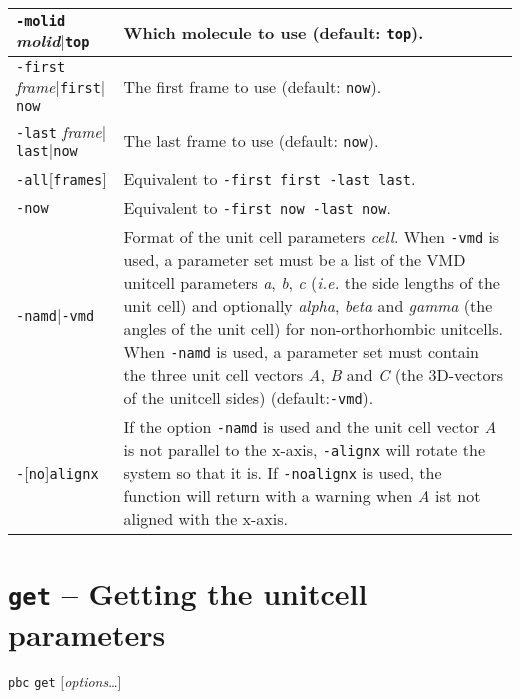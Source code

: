 \documentclass[a4paper, DIV12]{scrartcl}
\newcommand{\ie}{\emph{i.e.}\xspace}
\begin{document}
\begin{tabular}{|p{}|p{}|}
\hline

\texttt{-molid} \textit{molid}$|$\texttt{top}
& Which molecule to use (default: \texttt{top}).
\\ \hline

\texttt{-first} \textit{frame}$|$\texttt{first}$|$\texttt{now}
& The first frame to use (default: \texttt{now}).
\\ \hline

\texttt{-last} \textit{frame}$|$\texttt{last}$|$\texttt{now}
& The last frame to use (default: \texttt{now}).
\\ \hline

\texttt{-all}[\texttt{frames}]
& Equivalent to \texttt{-first first -last last}.
\\ \hline

\texttt{-now}
& Equivalent to \texttt{-first now -last now}.
\\ \hline

\texttt{-namd}$|$\texttt{-vmd}
& Format of the unit cell parameters \textit{cell}. When \texttt{-vmd}
is used, a parameter set must be a list of the VMD unitcell parameters
\textit{a}, \textit{b}, \textit{c} (\ie the side lengths of the unit
cell) and optionally \textit{alpha}, \textit{beta} and \textit{gamma}
(the angles of the unit cell) for non-orthorhombic unitcells. When
\texttt{-namd} is used, a parameter set must contain the three unit
cell vectors \textit{A}, \textit{B} and \textit{C} (the 3D-vectors of
the unitcell sides) (default:\texttt{-vmd}).
\\ \hline

\texttt{-}[\texttt{no}]\texttt{alignx} 
& If the option \texttt{-namd} is used and the unit cell vector
\textit{A} is not parallel to the x-axis, \texttt{-alignx} will rotate
the system so that it is. If \texttt{-noalignx} is used, the function
will return with a warning when \textit{A} ist not aligned with the
x-axis.
\\ \hline
\end{tabular}
 


\newpage
\section{\texttt{get} -- Getting the unitcell parameters}
\label{sec:get}

\texttt{pbc} \texttt{get} [\textit{options}\dots]
\end{document}
